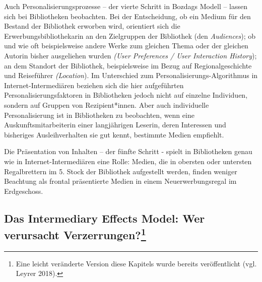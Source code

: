 \documentclass[a4paper,
fontsize=11pt,
oneside,
numbers=noperiodatend,
parskip=half-,
bibliography=totoc,
final
]{scrartcl}
\begin{document}
Auch Personalisierungsprozesse -- der vierte Schritt in Bozdags Modell
-- lassen sich bei Bibliotheken beobachten. Bei der Entscheidung, ob ein
Medium für den Bestand der Bibliothek erworben wird, orientiert sich die
Erwerbungsbibliothekarin an den Zielgruppen der Bibliothek (den
\emph{Audiences}); ob und wie oft beispielsweise andere Werke zum
gleichen Thema oder der gleichen Autorin bisher ausgeliehen wurden
\emph{(User Preferences / User Interaction History}); an dem Standort
der Bibliothek, beispielsweise im Bezug auf Regionalgeschichte und
Reiseführer \emph{(Location}). Im Unterschied zum
Personalisierungs-Algorithmus in Internet-Intermediären beziehen sich
die hier aufgeführten Personalisierungsfaktoren in Bibliotheken jedoch
nicht auf einzelne Individuen, sondern auf Gruppen von Rezipient*innen.
Aber auch individuelle Personalisierung ist in Bibliotheken zu
beobachten, wenn eine Auskunftsmitarbeiterin einer langjährigen Leserin,
deren Interessen und bisheriges Ausleihverhalten sie gut kennt,
bestimmte Medien empfiehlt.

Die Präsentation von Inhalten -- der fünfte Schritt - spielt in
Bibliotheken genau wie in Internet-Intermediären eine Rolle: Medien, die
in obersten oder untersten Regalbrettern im 5. Stock der Bibliothek
aufgestellt werden, finden weniger Beachtung als frontal präsentierte
Medien in einem Neuerwerbungsregal im Erdgeschoss.

\hypertarget{das-intermediary-effects-model-wer-verursacht-verzerrungen2}{%
\subsection[Das Intermediary Effects Model: Wer verursacht
Verzerrungen?]{\texorpdfstring{Das Intermediary Effects Model: Wer
verursacht Verzerrungen?\footnote{Eine leicht veränderte Version diese
  Kapitels wurde bereits veröffentlicht (vgl. Leyrer 2018).}}{Das Intermediary Effects Model: Wer verursacht Verzerrungen?}}\label{das-intermediary-effects-model-wer-verursacht-verzerrungen2}}
\end{document}
